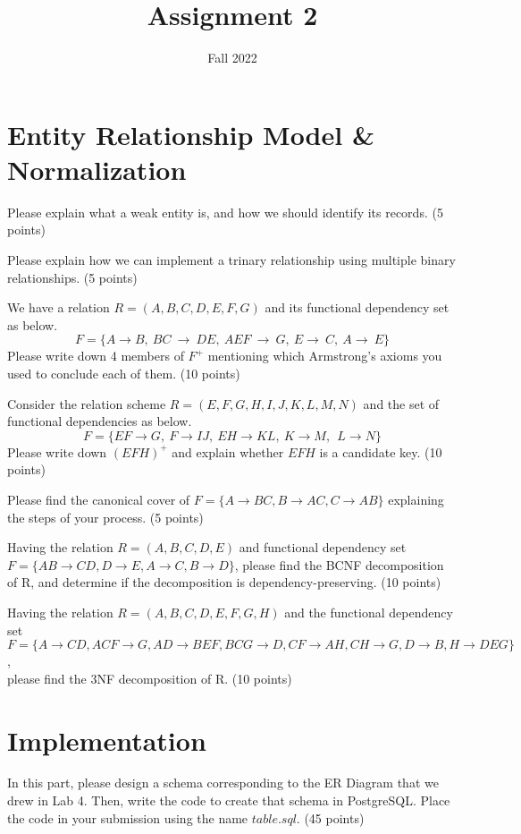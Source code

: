 \documentclass{homework}
\author{}
\date{Fall 2022}
\title{Assignment 2}
\begin{document}
 \maketitle

\section*{Entity Relationship Model \& Normalization}
\question Please explain what a weak entity is, and how we should identify its records. (5 points)


\question Please explain how we can implement a trinary relationship using multiple binary relationships. (5 points)

\question We have a relation $R=(A, B, C, D, E, F, G)$ and its functional dependency set as below.
\[F=\{A\rightarrow B,\:BC\:\rightarrow \:DE,\:AEF\:\rightarrow \:G,\:E\rightarrow \:C,\:A\rightarrow \:E\}\]
Please write down 4 members of $F^+$ mentioning which Armstrong's axioms you used to conclude each of them. (10 points) 

\question Consider the relation scheme $R=(E, F, G, H, I, J, K, L, M, N)$ and the set of functional dependencies as below.
\[F=\{EF\rightarrow G,\:F\rightarrow IJ,\:EH\rightarrow KL,\:K\rightarrow M,\:\:L\rightarrow N\}\]
Please write down $(EFH)^+$ and explain whether $EFH$ is a candidate key. (10 points)

\question Please find the canonical cover of $F=\{A\rightarrow BC, B\rightarrow AC, C\rightarrow AB\}$ explaining the steps of your process. (5 points)

\question Having the relation $R=(A, B, C, D, E)$ and functional dependency set $F=\{ AB \rightarrow CD, D\rightarrow E, A\rightarrow C, B\rightarrow D\}$, please find the BCNF decomposition of R, and determine if the decomposition is dependency-preserving. (10 points)

\question Having the relation $R=(A, B, C, D, E, F, G, H)$ and the functional dependency set \\
$F=\{A \rightarrow CD, ACF \rightarrow G, AD \rightarrow BEF, BCG \rightarrow D, CF \rightarrow AH,  CH \rightarrow G, D \rightarrow B,  H \rightarrow DEG \}$,\\ please find the 3NF decomposition of R. (10 points) 


\section*{Implementation}
In this part, please design a schema corresponding to the ER Diagram that we drew in Lab 4. Then, write the code to create that schema in PostgreSQL. Place the code in your submission using the name $table.sql$. (45 points)
\end{document}
